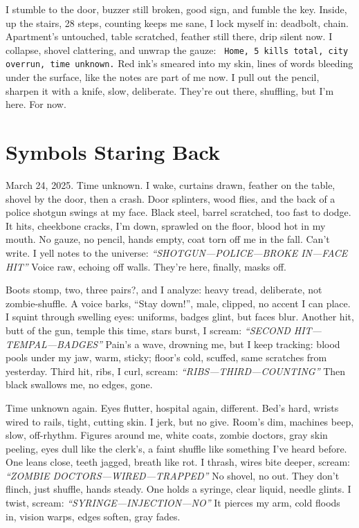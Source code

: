 \documentclass[12pt]{article}
\newcommand{\note}[1]{\texttt{\small \color{DarkGray} #1}}
\begin{document}
I stumble to the door, buzzer still broken, good sign, and fumble the key. Inside, up the stairs, 28 steps, counting keeps me sane, I lock myself in: deadbolt, chain. Apartment’s untouched, table scratched, feather still there, drip silent now. I collapse, shovel clattering, and unwrap the gauze: \note{Home, 5 kills total, city overrun, time unknown.} Red ink’s smeared into my skin, lines of words bleeding under the surface, like the notes are part of me now. I pull out the pencil, sharpen it with a knife, slow, deliberate. They’re out there, shuffling, but I’m here. For now.

\section{Symbols Staring Back}

March 24, 2025. Time unknown. I wake, curtains drawn, feather on the table, shovel by the door, then a crash. Door splinters, wood flies, and the back of a police shotgun swings at my face. Black steel, barrel scratched, too fast to dodge. It hits, cheekbone cracks, I’m down, sprawled on the floor, blood hot in my mouth. No gauze, no pencil, hands empty, coat torn off me in the fall. Can’t write. I yell notes to the universe: \textit{“SHOTGUN—POLICE—BROKE IN—FACE HIT”} Voice raw, echoing off walls. They’re here, finally, masks off.

Boots stomp, two, three pairs?, and I analyze: heavy tread, deliberate, not zombie-shuffle. A voice barks, “Stay down!”, male, clipped, no accent I can place. I squint through swelling eyes: uniforms, badges glint, but faces blur. Another hit, butt of the gun, temple this time, stars burst, I scream: \textit{“SECOND HIT—TEMPAL—BADGES”} Pain’s a wave, drowning me, but I keep tracking: blood pools under my jaw, warm, sticky; floor’s cold, scuffed, same scratches from yesterday. Third hit, ribs, I curl, scream: \textit{“RIBS—THIRD—COUNTING”} Then black swallows me, no edges, gone.

Time unknown again. Eyes flutter, hospital again, different. Bed’s hard, wrists wired to rails, tight, cutting skin. I jerk, but no give. Room’s dim, machines beep, slow, off-rhythm. Figures around me, white coats, zombie doctors, gray skin peeling, eyes dull like the clerk’s, a faint shuffle like something I’ve heard before. One leans close, teeth jagged, breath like rot. I thrash, wires bite deeper, scream: \textit{“ZOMBIE DOCTORS—WIRED—TRAPPED”} No shovel, no out. They don’t flinch, just shuffle, hands steady. One holds a syringe, clear liquid, needle glints. I twist, scream: \textit{“SYRINGE—INJECTION—NO”} It pierces my arm, cold floods in, vision warps, edges soften, gray fades.
\end{document}

